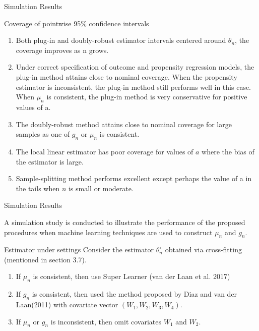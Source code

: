 \documentclass{beamer}
\begin{document}
\begin{frame}{Simulation Results}

\begin{block}{Coverage of pointwise 95$\%$ confidence intervals}
	\begin{enumerate}
	\item	Both plug-in and doubly-robust estimator intervals centered around $\theta_n$, the coverage improves as n grows.
	\item	Under correct specification of outcome and propensity regression models, the plug-in method attains close to nominal coverage. When the propensity estimator is inconsistent, the plug-in method still performs well in this case. When $\mu_n$ is consistent, the plug-in method is very conservative for positive values of a.
	\item	The doubly-robust method attains close to nominal coverage for large samples as one of $g_n$ or $\mu_n$ is consistent.
	\item	The local linear estimator has poor coverage for values of $a$ where the bias of the estimator is large.
	\item Sample-splitting method performs excellent except perhaps the value of a in the tails when $n$ is small or moderate.
	\end{enumerate}
\end{block}

\end{frame}


\begin{frame}{Simulation Results}

	A simulation study is conducted to illustrate the performance of the proposed procedures when machine learning techniques are used to construct $\mu_n$ and $g_n$.

\begin{block}{Estimator under settings}
	Consider the estimator $\theta^{\circ}_n$ obtained via cross-fitting (mentioned in section 3.7).
	\begin{enumerate}
	\item If $\mu_n$ is consistent, then use Super Learner (van der Laan et al. 2017)
	\item If $g_n$ is consistent, then used the method proposed by Diaz and van der Laan(2011) with covariate vector $(W_1,W_2,W_3,W_4)$.
	\item If $\mu_n$ or $g_n$ is inconsistent, then omit covariates $W_1$ and $W_2$.
	\end{enumerate}
\end{block}

\end{frame}
\end{document}
